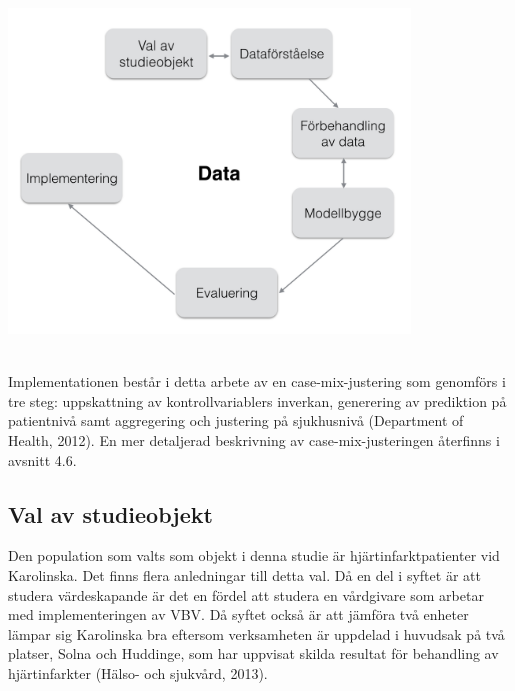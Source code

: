 \noindent\begin{minipage}{\textwidth}
\centering
\includegraphics[width=0.8\textwidth]{Data.png}
\label{fig:design}            
\end{minipage}
\\

Implementationen består i detta arbete av en case-mix-justering som genomförs i tre steg: uppskattning av kontrollvariablers inverkan, generering av prediktion på patientnivå samt aggregering och justering på sjukhusnivå (Department of Health, 2012). En mer detaljerad beskrivning av case-mix-justeringen återfinns i avsnitt 4.6.

\subsection{Val av studieobjekt}

Den population som valts som objekt i denna studie är hjärtinfarktpatienter vid Karolinska. Det finns flera anledningar till detta val. Då en del i syftet är att studera värdeskapande är det en fördel att studera en vårdgivare som arbetar med implementeringen av VBV. Då syftet också är att jämföra två enheter lämpar sig Karolinska bra eftersom verksamheten är uppdelad i huvudsak på två platser, Solna och Huddinge, som har uppvisat skilda resultat för behandling av hjärtinfarkter  (Hälso- och sjukvård, 2013).

